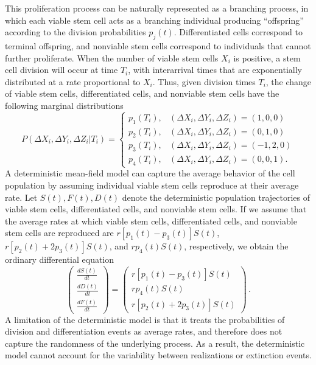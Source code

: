\documentclass[pdflatex,sn-mathphys-num]{sn-jnl}
\theoremstyle{thmstyleone}%
\theoremstyle{thmstyletwo}%
\theoremstyle{thmstylethree}%
\begin{document}
This proliferation process can be naturally represented as a branching process, in which each viable stem cell acts as a branching individual producing “offspring” according to the division probabilities $p_j(t)$. Differentiated cells correspond to terminal offspring, and nonviable stem cells correspond to individuals that cannot further proliferate. When the number of viable stem cells $X_i$ is positive, a stem cell division will occur at time $T_i$, with interarrival times that are exponentially distributed at a rate proportional to $X_i$. Thus, given division times $T_i$, the change of viable stem cells, differentiated cells, and nonviable stem cells have the following marginal distributions
\begin{equation}
    P(\Delta X_i, \Delta Y_i, \Delta Z_i \vert T_i) = \begin{cases}
        p_1(T_i), &  (\Delta X_i, \Delta Y_i, \Delta Z_i) = (1,0,0)\\
        p_2(T_i), & (\Delta X_i, \Delta Y_i, \Delta Z_i) = (0, 1, 0)\\
        p_3(T_i), & (\Delta X_i, \Delta Y_i, \Delta Z_i) = (-1, 2, 0)\\
        p_4(T_i), & (\Delta X_i, \Delta Y_i, \Delta Z_i) = (0, 0, 1).
    \end{cases}
    \label{marginal}
\end{equation}
A deterministic mean-field model can capture the average behavior of the cell population by assuming individual viable stem cells reproduce at their average rate. Let $S(t), F(t), D(t)$ denote the deterministic population trajectories of viable stem cells, differentiated cells, and nonviable stem cells. If we assume that the average rates at which viable stem cells, differentiated cells, and nonviable stem cells are reproduced are $r[p_1(t) - p_3(t)]S(t)$, $r[p_2(t) + 2p_3(t)] S(t)$, and $rp_4(t)S(t)$, respectively, we obtain the ordinary differential equation
\begin{equation}\label{transition1}
\begin{pmatrix}
\frac{dS(t)}{dt}\\\frac{dD(t)}{dt}\\\frac{dF(t)}{dt}
\end{pmatrix} =
\begin{pmatrix}
r[p_1(t)-p_3(t)]S(t)\\rp_4(t)S(t)\\r[p_2(t)+2p_3(t)]S(t)
\end{pmatrix} \,.
\end{equation}
A limitation of the deterministic model is that it treats the probabilities of division and differentiation events as average rates, and therefore does not capture the randomness of the underlying process. As a result, the deterministic model cannot account for the variability between realizations or extinction events.
\end{document}

